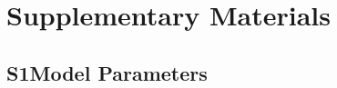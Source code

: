 %

\section*{Supplementary Materials}

\renewcommand{\thetable}{S\arabic{table}}
\renewcommand{\thefigure}{S\arabic{figure}}
\renewcommand{\theequation}{S\arabic{equation}}
\setcounter{table}{0}
\setcounter{figure}{0}
\setcounter{equation}{0}

\subsection*{S1\quad Model Parameters}

